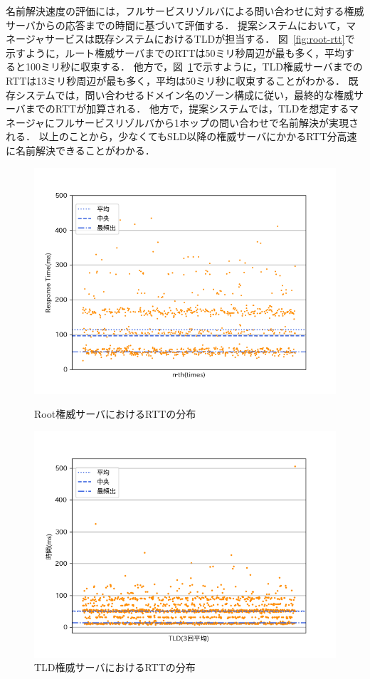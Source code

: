 名前解決速度の評価には，フルサービスリゾルバによる問い合わせに対する権威サーバからの応答までの時間に基づいて評価する．
提案システムにおいて，マネージャサービスは既存システムにおけるTLDが担当する．
図~\ref{fig:root-rtt}で示すように，ルート権威サーバまでのRTTは50ミリ秒周辺が最も多く，平均すると100ミリ秒に収束する．
他方で，図~\ref{fig:tld-rtt}で示すように，TLD権威サーバまでのRTTは13ミリ秒周辺が最も多く，平均は50ミリ秒に収束することがわかる．
既存システムでは，問い合わせるドメイン名のゾーン構成に従い，最終的な権威サーバまでのRTTが加算される．
他方で，提案システムでは，TLDを想定するマネージャにフルサービスリゾルバから1ホップの問い合わせで名前解決が実現される．
以上のことから，少なくてもSLD以降の権威サーバにかかるRTT分高速に名前解決できることがわかる．
\begin{figure}[htbp]
 \centering
 \includegraphics[scale=0.8]{figure/root-rtt.png}
 \vspace{-1cm}
 \caption{Root権威サーバにおけるRTTの分布}
 \label{fig:root-rtt}
 \includegraphics[scale=0.8]{figure/average_rtt.png}
 \vspace{-1cm}
 \caption{TLD権威サーバにおけるRTTの分布}
 \label{fig:tld-rtt}
\end{figure}

